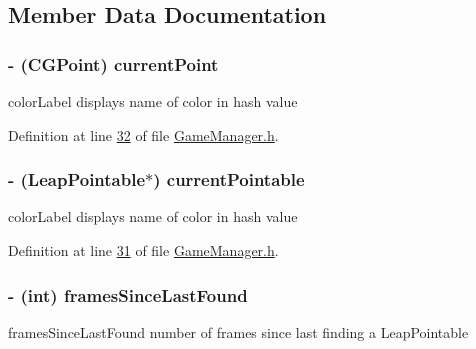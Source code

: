 \subsection{Member Data Documentation}
\hypertarget{interface_game_manager_a880d3cc994cc208b57a97fac088c2781}{
\subsubsection[{current\-Point}]{\setlength{\rightskip}{0pt plus 5cm}-\/ (C\-G\-Point) current\-Point\hspace{0.3cm}{\ttfamily [protected]}}}\label{d4/d94/interface_game_manager_a880d3cc994cc208b57a97fac088c2781}
color\-Label displays name of color in hash value 

Definition at line \hyperlink{_game_manager_8h_source_l00032}{32} of file \hyperlink{_game_manager_8h_source}{Game\-Manager.\-h}.

\hypertarget{interface_game_manager_a9899e94be0e9364a59e5b76d5025d9f7}{
\subsubsection[{current\-Pointable}]{\setlength{\rightskip}{0pt plus 5cm}-\/ (Leap\-Pointable$\ast$) current\-Pointable\hspace{0.3cm}{\ttfamily [protected]}}}\label{d4/d94/interface_game_manager_a9899e94be0e9364a59e5b76d5025d9f7}
color\-Label displays name of color in hash value 

Definition at line \hyperlink{_game_manager_8h_source_l00031}{31} of file \hyperlink{_game_manager_8h_source}{Game\-Manager.\-h}.

\hypertarget{interface_game_manager_a546c4660d830a79c27bc2a51da00df12}{
\subsubsection[{frames\-Since\-Last\-Found}]{\setlength{\rightskip}{0pt plus 5cm}-\/ (int) frames\-Since\-Last\-Found\hspace{0.3cm}{\ttfamily [protected]}}}\label{d4/d94/interface_game_manager_a546c4660d830a79c27bc2a51da00df12}
frames\-Since\-Last\-Found number of frames since last finding a Leap\-Pointable 

